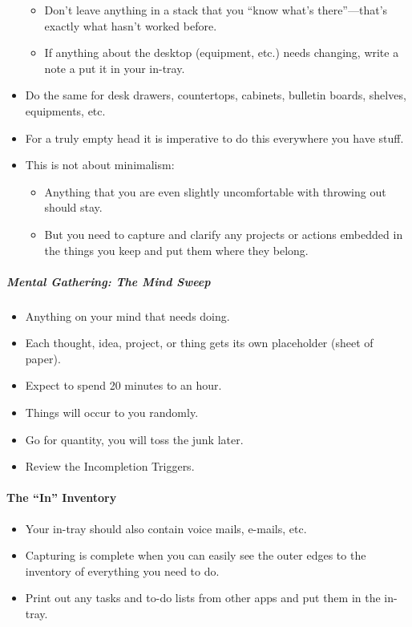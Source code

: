 \documentclass{article}
\begin{document}
\begin{itemize}
\begin{itemize}
    \item Don't leave anything in a stack that you ``know what's there''---that's exactly what hasn't worked before.
    \item If anything about the desktop (equipment, etc.) needs changing, write a note a put it in your in-tray.
  \end{itemize}
  \item Do the same for desk drawers, countertops, cabinets, bulletin boards, shelves, equipments, etc.
  \item For a truly empty head it is imperative to do this everywhere you have stuff.
  \item This is not about minimalism:
  \begin{itemize}
    \item Anything that you are even slightly uncomfortable with throwing out should stay.
    \item But you need to capture and clarify any projects or actions embedded in the things you keep and put them where they belong.
  \end{itemize}
\end{itemize}

\subparagraph{Mental Gathering: The Mind Sweep}

\begin{itemize}
  \item Anything on your mind that needs doing.
  \item Each thought, idea, project, or thing gets its own placeholder (sheet of paper).
  \item Expect to spend 20 minutes to an hour.
  \item Things will occur to you randomly.
  \item Go for quantity, you will toss the junk later.
  \item Review the Incompletion Triggers.
\end{itemize}

\paragraph{The ``In'' Inventory}

\begin{itemize}
  \item Your in-tray should also contain voice mails, e-mails, etc.
  \item Capturing is complete when you can easily see the outer edges to the inventory of everything you need to do.
  \item Print out any tasks and to-do lists from other apps and put them in the in-tray.
\end{itemize}
\end{document}
